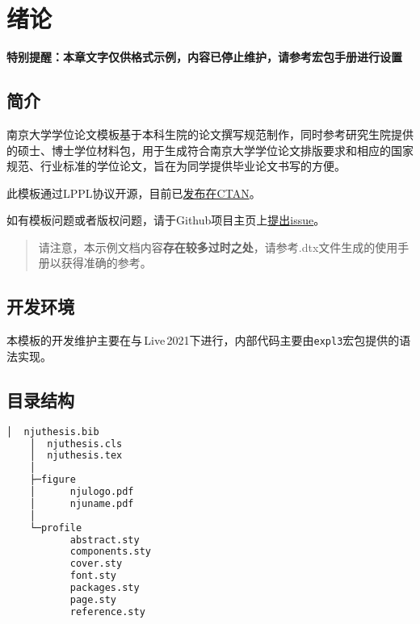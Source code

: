 \chapter{绪论}

\textbf{特别提醒：本章文字仅供格式示例，内容已停止维护，请参考宏包手册进行设置}

\section{简介}
南京大学学位论文模板\cite{njuthesis}基于本科生院的论文撰写规范制作，同时参考研究生院提供的硕士、博士学位材料包，用于生成符合南京大学学位论文排版要求和相应的国家规范、行业标准的学位论文，旨在为同学提供毕业论文书写的方便。

此模板通过LPPL协议开源，目前已\href{https://ctan.org/pkg/njuthesis}{发布在CTAN}。

如有模板问题或者版权问题，请于Github项目主页上\href{https://github.com/nju-lug/NJUThesis/issues}{提出issue}。

\begin{quotation}
    请注意，本示例文档内容\textbf{存在较多过时之处}，请参考.dtx文件生成的使用手册以获得准确的参考。
\end{quotation}

\section{开发环境}

本模板的开发维护主要在与\,Live\,2021下进行，内部代码主要由\lstinline|expl3|宏包提供的语法实现。

\section{目录结构}
\label{sec:directory}

\begin{lstlisting}[language=bash]
    │  njuthesis.bib
    │  njuthesis.cls
    │  njuthesis.tex
    │
    ├─figure
    │      njulogo.pdf
    │      njuname.pdf
    │
    └─profile
           abstract.sty
           components.sty
           cover.sty
           font.sty
           packages.sty
           page.sty
           reference.sty
\end{lstlisting}

